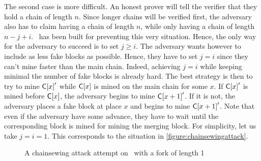       The second case is more difficult. An honest prover will tell the verifier that they hold a chain of length \(n\). Since longer chains will be verified first, the adversary also has to claim having a chain of length \(n\), while only having a chain of length \(n-j+i\). \FC\ has been built for preventing this very situation. Hence, the only way for the adversary to succeed is to set \(j\geqslant i\). The adversary wants however to include as less fake blocks as possible. Hence, they have to set \(j=i\) since they can't mine faster than the main chain. Indeed, achieving \(j=i\) while keeping minimal the number of fake blocks is already hard.  The best strategy is then to try to mine \(\mathsf{C[}x\mathsf{]}'\) while \(\mathsf{C[}x\mathsf{]}\) is mined on the main chain for some \(x\). If \(\mathsf{C[}x\mathsf{]}'\) is mined before \(\mathsf{C[}x\mathsf{]}\), the adversary begins to mine \(\mathsf{C[}x+1\mathsf{]}'\). If it is not, the adversary places a fake block at place \(x\) and begins to mine \(\mathsf{C[}x+1\mathsf{]}'\). Note that even if the adversary have some advance, they have to wait until the corresponding block is mined for mining the merging block. For simplicity, let us take \(j=i=1\). This corresponds to the situation in \autoref{figure:chainsewingattack}.
      
      \begin{figure}[ht]
        \centering
          \caption{A chainsewing attack attempt on \FC\ with a fork of length 1}
          \label{figure:chainsewingattack}
        \end{figure}
        
